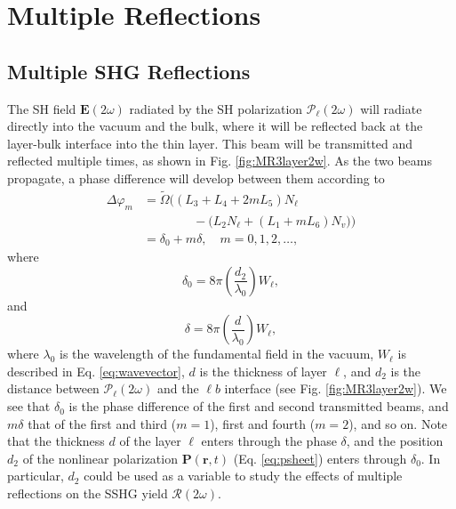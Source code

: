 \documentclass[aps,pra,10pt,amsmath,twocolumn,letterpaper]{revtex4-1}
\begin{document}


\section{Multiple Reflections}


\subsection{Multiple SHG Reflections}

The SH field $\mathbf{E}(2\omega)$ radiated by the SH polarization
$\boldsymbol{\mathcal{P}}_{\ell}(2\omega)$ will radiate directly into the vacuum
and the bulk, where it will be reflected back at the layer-bulk interface into
the thin layer. This beam will be transmitted and reflected multiple times, as
shown in Fig. \ref{fig:MR3layer2w}. As the two beams propagate, a phase
difference will develop between them according to
\begin{equation*}\label{eq:m99}
\begin{split}
\Delta\varphi_{m} 
&= \tilde{\Omega}
\Big(
(L_{3} + L_{4} + 2mL_{5})N_{\ell}\\
&\qquad\qquad- \big(L_{2}N_{\ell} + (L_{1} + mL_{6})N_{v}\big)
\Big)\\
&= \delta_{0} + m\delta,\quad m=0,1,2,\ldots,
\end{split}
\end{equation*}
where
\begin{equation}\label{eq:delta0}
\delta_{0} =
8\pi\left(\frac{d_{2}}{\lambda_{0}}\right)W_{\ell},
\end{equation}
and
\begin{equation}\label{eq:delta}
\delta = 8\pi
\left(\frac{d}{\lambda_{0}}\right)W_{\ell},
\end{equation}
where $\lambda_{0}$ is the wavelength of the fundamental field in the vacuum,
$W_{\ell}$ is described in Eq. \eqref{eq:wavevector}, $d$ is the thickness of
layer $\ell$, and $d_{2}$ is the distance between
$\boldsymbol{\mathcal{P}}_{\ell}(2\omega)$ and the $\ell b$ interface (see Fig.
\ref{fig:MR3layer2w}). We see that $\delta_{0}$ is the phase difference of the
first and second transmitted beams, and $m\delta$ that of the first and third
($m = 1$), first and fourth ($m = 2$), and so on. Note that the thickness $d$ of
the layer $\ell$ enters through the phase $\delta$, and the position $d_{2}$ of
the nonlinear polarization $\mathbf{P}(\mathbf{r},t)$ (Eq. \eqref{eq:psheet})
enters through $\delta_{0}$. In particular, $d_{2}$ could be used as a variable
to study the effects of multiple reflections on the SSHG yield
$\mathcal{R}(2\omega)$.
\end{document}
